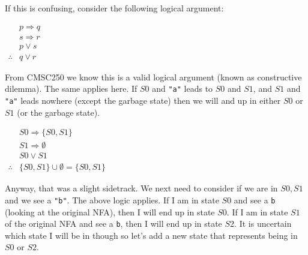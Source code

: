\documentclass[main.tex]{subfiles}
\begin{document}
If this is confusing, consider the following logical argument: 
\begin{center}
    $\begin{array}{rl}
         & p \Rightarrow q \\
         & s \Rightarrow r \\
         & p \lor s\\\hline
         \therefore & q \lor r
    \end{array}$
\end{center}
From CMSC250 we know this is a valid logical argument (known as constructive dilemma). The same applies here. If $S0$ and \texttt{"a"} leads to $S0$ and $S1$, and $S1$ and \texttt{"a"} leads nowhere (except the garbage state) then we will and up in either $S0$ or $S1$ (or the garbage state). 
\begin{center}
    $\begin{array}{rl}
         & S0 \Rightarrow \{S0,S1\} \\
         & S1 \Rightarrow \emptyset \\
         & S0 \lor S1\\\hline
         \therefore & \{S0,S1\} \cup \emptyset = \{S0,S1\}
    \end{array}$
\end{center}

Anyway, that was a slight sidetrack. We next need to consider if we are in $S0,S1$ and we see a \texttt{"b"}. The above logic applies. If I am in state $S0$ and see a \texttt{b} (looking at the original NFA), then I will end up in state $S0$. If I am in state $S1$ of the original NFA and see a \texttt{b}, then I will end up in state $S2$. It is uncertain which state I will be in though so let's add a new state that represents being in $S0$ or $S2$. 
\begin{center}
\end{center}
\end{document}

